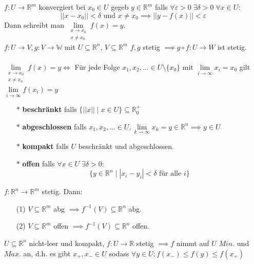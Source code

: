     $f:U\rightarrow\mathbb R^m$ konvergiert bei $x_0\in U$ gegeb $y\in\mathbb
    R^m$ falls $\forall\varepsilon>0\;\exists\delta>0\;\forall x\in U:$
    $$
      ||x-x_0||<\delta \text{ und } x\neq x_0\implies ||y-f(x)||<\varepsilon
    $$
    Dann schreibt man $\lim\limits_{\substack{x\rightarrow x_0\\x\neq x_0}}f(x)=y$.\\
    $f: U\rightarrow V, g: V\rightarrow\mathbb W$ mit $U\subseteq\mathbb R^n$,
    $V\subseteq\mathbb R^m$ $f,g$ stetig $\implies g\circ f:U\rightarrow W$ ist
    stetig.\\\\
    $\lim\limits_{\substack{x\rightarrow x_0\\ x\neq x_0}}f(x)=y\iff$ Für jede
    Folge $x_1,x_2,...\in U\setminus\{x_0\}$ mit
    $\lim\limits_{i\rightarrow\infty} x_i=x_0$ gilt
    $\lim\limits_{i\rightarrow\infty}f(x_i)=y$\\
    \begin{enumerate}
      \item[$*$] \textbf{beschränkt} falls $\{||x||\mid x\in U\}\subseteq\mathbb
        R^+_0$
      \item[$*$] \textbf{abgeschlossen} falls $x_1,x_2,...\in U, 
        \lim\limits_{k\rightarrow\infty}x_k=y\in\mathbb R^n\implies y\in U$
      \item[$*$] \textbf{kompakt} falls $U$ beschränkt und abgeschlossen.
      \item[$*$] \textbf{offen} falls $\forall x\in U\;\exists\delta>0:$
        $$\{y\in\mathbb R^n\mid|x_i-y_i|<\delta\text{ für alle } i\}$$
    \end{enumerate}
    $f:\mathbb R^n\rightarrow\mathbb R^m$ stetig. Dann:
    \begin{enumerate}
      \item[(1)] $V\subseteq\mathbb R^m$ abg $\implies 
        f^{-1}(V)\subseteq\mathbb R^n$ abg.
      \item[(2)] $V\subseteq\mathbb R^m$ offen $\implies
        f^{-1}(V)\subseteq\mathbb R^n$ offen.
    \end{enumerate}
    $U\subseteq\mathbb R^n$ nicht-leer und kompakt, $f:U\rightarrow\mathbb R$
    stetig $\implies f$ nimmt auf $U$ $Min.$ und $Max.$ an, d.h. es gibt
    $x_+,x_-\in U$ sodass $\forall y\in U: f(x_-)\leq f(y)\leq f(x_+)$
